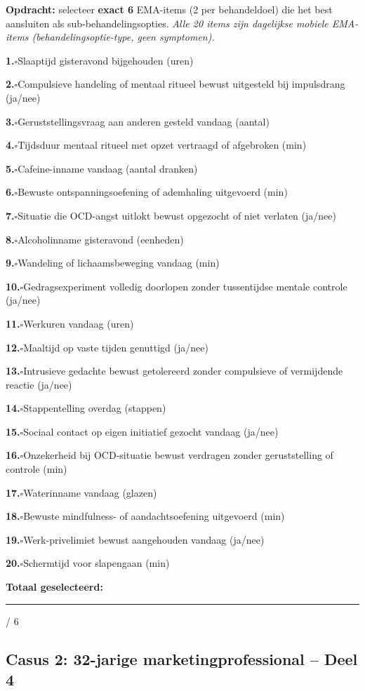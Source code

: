 \documentclass[11pt,a4paper]{article}
\newcommand{\checkitemBFS}[2]{%
\noindent\small\textbf{#1.}\hspace{0.45em}$\square$\hspace{0.4em}#2\par\vspace{0.20em}}
\begin{document}
\begin{responsebox}
\small\textbf{Opdracht:} selecteer \textbf{exact 6} EMA-items (2 per behandeldoel) die het best aansluiten als sub-behandelingsopties.
\textit{Alle 20 items zijn dagelijkse mobiele EMA-items (behandelingsoptie-type, geen symptomen).}

\checkitemBFS{1}{Slaaptijd gisteravond bijgehouden (uren)}
\checkitemBFS{2}{Compulsieve handeling of mentaal ritueel bewust uitgesteld bij impulsdrang (ja/nee)}
\checkitemBFS{3}{Geruststellingsvraag aan anderen gesteld vandaag (aantal)}
\checkitemBFS{4}{Tijdsduur mentaal ritueel met opzet vertraagd of afgebroken (min)}
\checkitemBFS{5}{Cafeine-inname vandaag (aantal dranken)}
\checkitemBFS{6}{Bewuste ontspanningsoefening of ademhaling uitgevoerd (min)}
\checkitemBFS{7}{Situatie die OCD-angst uitlokt bewust opgezocht of niet verlaten (ja/nee)}
\checkitemBFS{8}{Alcoholinname gisteravond (eenheden)}
\checkitemBFS{9}{Wandeling of lichaamsbeweging vandaag (min)}
\checkitemBFS{10}{Gedragsexperiment volledig doorlopen zonder tussentijdse mentale controle (ja/nee)}
\checkitemBFS{11}{Werkuren vandaag (uren)}
\checkitemBFS{12}{Maaltijd op vaste tijden genuttigd (ja/nee)}
\checkitemBFS{13}{Intrusieve gedachte bewust getolereerd zonder compulsieve of vermijdende reactie (ja/nee)}
\checkitemBFS{14}{Stappentelling overdag (stappen)}
\checkitemBFS{15}{Sociaal contact op eigen initiatief gezocht vandaag (ja/nee)}
\checkitemBFS{16}{Onzekerheid bij OCD-situatie bewust verdragen zonder geruststelling of controle (min)}
\checkitemBFS{17}{Waterinname vandaag (glazen)}
\checkitemBFS{18}{Bewuste mindfulness- of aandachtsoefening uitgevoerd (min)}
\checkitemBFS{19}{Werk-privelimiet bewust aangehouden vandaag (ja/nee)}
\checkitemBFS{20}{Schermtijd voor slapengaan (min)}
\vspace{0.4em}
\noindent\textbf{Totaal geselecteerd:}\hspace{0.5em}\rule{1.2cm}{0.25pt}\hspace{0.2em}/ 6
\end{responsebox}

\vspace{0.6em}
\newpage
\subsection*{Casus 2: 32-jarige marketingprofessional -- Deel 4}
\end{document}
